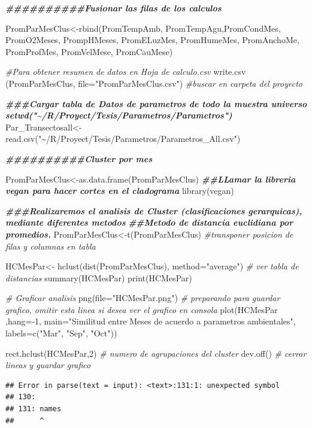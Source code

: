 \documentclass[
]{article}
\newenvironment{Shaded}{\begin{snugshade}}{\end{snugshade}}
\newcommand{\AttributeTok}[1]{\textcolor[rgb]{0.77,0.63,0.00}{#1}}
\newcommand{\CommentTok}[1]{\textcolor[rgb]{0.56,0.35,0.01}{\textit{#1}}}
\newcommand{\DecValTok}[1]{\textcolor[rgb]{0.00,0.00,0.81}{#1}}
\newcommand{\DocumentationTok}[1]{\textcolor[rgb]{0.56,0.35,0.01}{\textbf{\textit{#1}}}}
\newcommand{\FunctionTok}[1]{\textcolor[rgb]{0.00,0.00,0.00}{#1}}
\newcommand{\NormalTok}[1]{#1}
\newcommand{\OtherTok}[1]{\textcolor[rgb]{0.56,0.35,0.01}{#1}}
\newcommand{\SpecialCharTok}[1]{\textcolor[rgb]{0.00,0.00,0.00}{#1}}
\newcommand{\StringTok}[1]{\textcolor[rgb]{0.31,0.60,0.02}{#1}}
\begin{document}
\begin{Shaded}
\begin{Highlighting}[]
\DocumentationTok{\#\#\#\#\#\#\#\#\#\#Fusionar las filas de los calculos}

\NormalTok{PromParMesClus}\OtherTok{\textless{}{-}}\FunctionTok{rbind}\NormalTok{(PromTempAmb, PromTempAgu,PromCondMes, PromO2Meses, PrompHMeses, PromELuzMes, PromHumeMes, PromAnchoMe, PromProfMes, PromVelMese, PromCauMese)}

\CommentTok{\#Para obtener resumen de datos en Hoja de calculo.csv}
\FunctionTok{write.csv}\NormalTok{ (PromParMesClus, }\AttributeTok{file=}\StringTok{"PromParMesClus.csv"}\NormalTok{) }\CommentTok{\#buscar en carpeta del proyecto}


\DocumentationTok{\#\#\#Cargar tabla de Datos de parametros de todo la muestra universo setwd("\textasciitilde{}/R/Proyect/Tesis/Parametros/Parametros")}
\NormalTok{Par\_Transectosall}\OtherTok{\textless{}{-}} \FunctionTok{read.csv}\NormalTok{(}\StringTok{"\textasciitilde{}/R/Proyect/Tesis/Parametros/Parametros\_All.csv"}\NormalTok{)}

\DocumentationTok{\#\#\#\#\#\#\#\#\#\#Cluster por mes }

\NormalTok{PromParMesClus}\OtherTok{\textless{}{-}}\FunctionTok{as.data.frame}\NormalTok{(PromParMesClus)}
\DocumentationTok{\#\#LLamar la libreria vegan para hacer cortes en el cladograma}
\FunctionTok{library}\NormalTok{(vegan)}

\DocumentationTok{\#\#\#Realizaremos el analisis de Cluster (clasificaciones gerarquicas), mediante diferentes metodos}
\DocumentationTok{\#\#Metodo de distancia euclidiana por promedios.}
\NormalTok{PromParMesClus}\OtherTok{\textless{}{-}}\FunctionTok{t}\NormalTok{(PromParMesClus) }\CommentTok{\#transponer posicion de filas y columnas en tabla}

\NormalTok{HCMesPar}\OtherTok{\textless{}{-}} \FunctionTok{hclust}\NormalTok{(}\FunctionTok{dist}\NormalTok{(PromParMesClus), }\AttributeTok{method=}\StringTok{"average"}\NormalTok{)}
\CommentTok{\# ver tabla de distancias}
\FunctionTok{summary}\NormalTok{(HCMesPar)}
\FunctionTok{print}\NormalTok{(HCMesPar)}

\CommentTok{\# Graficar analisis}
\FunctionTok{png}\NormalTok{(}\AttributeTok{file=}\StringTok{"HCMesPar.png"}\NormalTok{) }\CommentTok{\# preparando para guardar grafico, omitir esta linea si desea ver el grafico en consola}
\FunctionTok{plot}\NormalTok{(HCMesPar ,}\AttributeTok{hang=}\SpecialCharTok{{-}}\DecValTok{1}\NormalTok{, }\AttributeTok{main=}\StringTok{"Similitud entre Meses de acuerdo a parametros ambientales"}\NormalTok{, }\AttributeTok{labels=}\FunctionTok{c}\NormalTok{(}\StringTok{"Mar"}\NormalTok{, }\StringTok{"Sep"}\NormalTok{, }\StringTok{"Oct"}\NormalTok{))}

\FunctionTok{rect.hclust}\NormalTok{(HCMesPar,}\DecValTok{2}\NormalTok{) }\CommentTok{\# numero de agrupaciones del cluster}
\FunctionTok{dev.off}\NormalTok{() }\CommentTok{\# cerrar lineas y guardar grafico}
\end{Highlighting}
\end{Shaded}

\begin{verbatim}
## Error in parse(text = input): <text>:131:1: unexpected symbol
## 130: 
## 131: names
##      ^
\end{verbatim}
\end{document}
